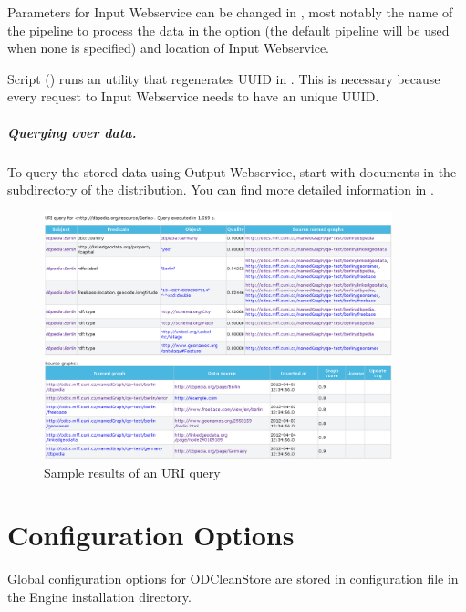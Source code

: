    Parameters for Input Webservice can be changed in 
   , most notably the name of the pipeline to 
   process the data in the  option (the default pipeline will be used when none is specified) and location of Input Webservice.
      
   Script  () runs an utility that regenerates UUID in
   . This is necessary because every request
   to Input Webservice needs to have an unique UUID.

\paragraph{Querying over data.} To query the stored data using Output Webservice, start with  documents in 
  the  subdirectory of the distribution. You can find more detailed information in .

\begin{figure}[hb]
    \centering
    \includegraphics[width=0.9\textwidth]{images/uri-query-screenshot.png}
    \caption{Sample results of an URI query}
    \label{fig:uriQuery}
\end{figure}

\chapter{Configuration Options}
 \label{chap:configOptions}
Global configuration options for ODCleanStore are stored in configuration file  in the Engine installation directory.

